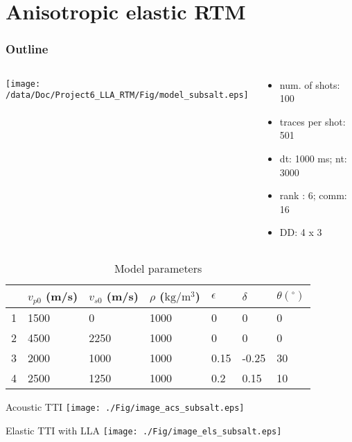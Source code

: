 \documentclass[aspectratio=169]{beamer}
\begin{document}
\section{Anisotropic elastic RTM}
\begin{frame}
\frametitle{Outline}
\tableofcontents[currentsection]
\end{frame}
\begin{frame}
\begin{columns}
  \begin{column}{0.7\textwidth}
  \texttt{[image: /data/Doc/Project6\_LLA\_RTM/Fig/model\_subsalt.eps]}
  \end{column}
  \begin{column}{0.3\textwidth}
\begin{itemize}
\item{num. of shots: 100}
\item{traces per shot: 501}
\item{dt: 1000 ms; nt: 3000}
\item{rank : 6; comm: 16}
\item{DD: 4 x 3}
\end{itemize}
  \end{column}
\end{columns}

\begin{table}[]
\centering
\begin{tabular}{|l|l|l|l|l|l|l|}
\hline
  &  $v_{p0}$ (m/s) & $v_{s0}$ (m/s) & $\rho$ ($\mathrm{kg/m^3}$) & $\epsilon$ & $\delta$  & $\theta(^\circ)$ \\ \hline
1 & 1500     & 0        & 1000        & 0    & 0     & 0    \\ \hline
2 & 4500     & 2250     & 1000        & 0    & 0     & 0    \\ \hline
3 & 2000     & 1000     & 1000        & 0.15 & -0.25 & 30   \\ \hline
4 & 2500     & 1250     & 1000        & 0.2  & 0.15  & 10   \\ \hline
\end{tabular}
\caption{Model parameters}
\end{table}
\end{frame}
\begin{frame}{Acoustic TTI}
\center
  \texttt{[image: ./Fig/image\_acs\_subsalt.eps]}
\end{frame}
\begin{frame}{Elastic TTI with LLA}
\center
  \texttt{[image: ./Fig/image\_els\_subsalt.eps]}
\end{frame}
\end{document}
